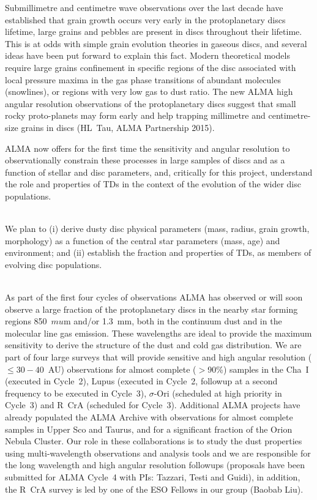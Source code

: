 Submillimetre and centimetre wave observations over the last decade have established that grain growth occurs very early in the protoplanetary discs lifetime, large grains and pebbles are present in discs throughout their lifetime. This is at odds with simple grain evolution theories in gaseous discs, and several ideas have been put forward to explain this fact. Modern theoretical models require large grains confinement in specific regions of the disc associated with local pressure maxima in the gas phase transitions of abundant molecules (snowlines), or regions with very low gas to dust ratio. The new ALMA high angular resolution observations of the protoplanetary discs suggest that small rocky proto-planets may form early and help trapping millimetre and centimetre-size grains in discs (HL~Tau, ALMA Partnership 2015).  

ALMA now offers for the first time the sensitivity and angular resolution to observationally constrain these processes in large samples of discs and as a function of stellar and disc parameters, and, critically for this project, understand the role and properties of TDs in the context of the evolution of the wider disc populations.


\vspace{0.5em}
\\
We plan to (i) derive dusty disc physical parameters (mass, radius, grain growth, morphology) as a function of the central star parameters (mass, age) and environment; and (ii) establish the fraction and properties of TDs, as members  of evolving disc populations.

\vspace{0.5em}
\\
%
\noindent 
As part of the first four cycles of observations ALMA has observed or will soon observe a large fraction of the protoplanetary discs in the nearby star forming regions 850~$mu$m and/or 1.3~mm, both in the continuum dust and in the molecular line gas emission. These wavelengths are ideal to provide the maximum sensitivity to derive the structure of the dust and cold gas distribution. We are part of four large surveys that will provide sensitive and high angular resolution ($\le 30-40$~AU) observations for almost complete ($>$90\%) samples in the Cha~I (executed in Cycle~2), Lupus (executed in Cycle~2, followup at a second frequency to be executed in Cycle~3), $\sigma$-Ori (scheduled at high priority in Cycle~3) and R~CrA (scheduled for Cycle~3). Additional ALMA projects have already populated the ALMA Archive with observations for almost complete samples in Upper Sco and Taurus, and for a significant fraction of the Orion Nebula Cluster. Our role in these collaborations is to study the dust properties using multi-wavelength observations and analysis tools and we are responsible for the long wavelength and high angular resolution followups (proposals have been submitted for ALMA Cycle~4 with PIs: Tazzari, Testi and Guidi), in addition, the R~CrA survey is led by one of the ESO Fellows in our group (Baobab Liu). 

